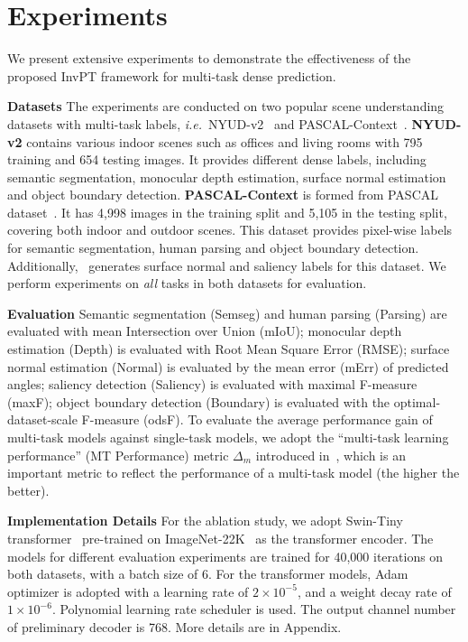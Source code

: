 \documentclass[runningheads]{llncs}
\newcommand*{\ie}{\emph{i.e.}}
\begin{document}
\section{Experiments}
\vspace{-6pt}
We present extensive experiments to demonstrate the effectiveness of the proposed InvPT framework for multi-task dense prediction.
\vspace{3pt}
\par\noindent\textbf{Datasets} The experiments are conducted on two popular scene understanding datasets with multi-task labels, \ie~NYUD-v2~\cite{silberman2012indoor} and PASCAL-Context~\cite{chen2014detect}.
\textbf{NYUD-v2} contains various indoor scenes such as offices and living rooms with 795 training and 654 testing images. It provides different dense labels, including semantic segmentation, monocular depth estimation, surface normal estimation  and object boundary detection.
\textbf{PASCAL-Context} is formed from PASCAL dataset~\cite{everingham2010pascal}. It has 4,998 images in the training split and 5,105 in the testing split, covering both indoor and outdoor scenes. This dataset provides pixel-wise labels for semantic segmentation, human parsing and object boundary detection. Additionally,~\cite{astmt} generates surface normal and saliency labels for this dataset.
We perform experiments on \emph{all} tasks in both datasets for evaluation.

\vspace{3pt}
\par\noindent\textbf{Evaluation}
Semantic segmentation (Semseg) and human parsing (Parsing) are evaluated with mean Intersection over Union (mIoU); monocular depth estimation (Depth) is evaluated with Root Mean Square Error (RMSE);
surface normal estimation (Normal) is evaluated by the mean error (mErr) of predicted angles; saliency detection (Saliency) is evaluated with maximal F-measure (maxF); object boundary detection (Boundary) is evaluated with the optimal-dataset-scale F-measure (odsF). To evaluate the average performance gain of multi-task models against single-task models, we adopt the ``multi-task learning performance'' (MT Performance) metric $\Delta_m$ introduced in~\cite{astmt}, which is an important metric to reflect the performance of a multi-task model (the higher the better).

\vspace{3pt}
\par\noindent\textbf{Implementation Details}
For the ablation study, we adopt Swin-Tiny transformer~\cite{swin} pre-trained on ImageNet-22K~\cite{deng2009imagenet} as the transformer encoder. The models for different evaluation experiments are trained for 40,000 iterations on both datasets, with a batch size of 6. For the transformer models, Adam optimizer is adopted with a learning rate of $2\times 10^{-5}$, and a weight decay rate of $1\times 10^{-6}$. Polynomial learning rate scheduler is used.
The output channel number of preliminary decoder is 768. More details are in Appendix.
\end{document}
